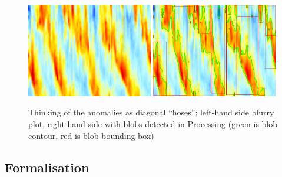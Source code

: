 \documentclass[11pt,a4paper]{article}
\begin{document}
\begin{figure}
\includegraphics[width=0.49\textwidth]{figures/qbo-field-magnified.jpg}%
\hspace{0.02\textwidth}%
\includegraphics[width=0.49\textwidth]{figures/qbo-field-blobs.jpg}
\caption{Thinking of the anomalies as diagonal ``hoses''; left-hand side blurry plot, right-hand side with blobs detected in Processing (green is blob contour, red is blob bounding box)}
\label{fig:qbo-field-blobs}
\end{figure}

\subsection{Formalisation}
\end{document}
